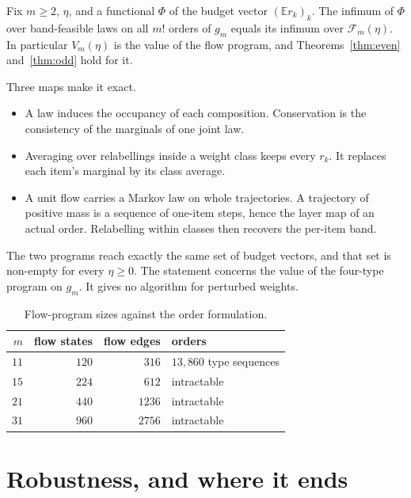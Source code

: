 \begin{theorem}
\label{thm:flow}
Fix $m\ge2$, $\eta$, and a functional $\Phi$ of the budget vector $(\mathbb{E}r_{k})_{k}$. The
infimum of $\Phi$ over band-feasible laws on all $m!$ orders of $g_{m}$ equals its infimum
over $\mathcal{F}_{m}(\eta)$. In particular $V_{m}(\eta)$ is the value of the flow program,
and Theorems~\ref{thm:even} and~\ref{thm:odd} hold for it.
\end{theorem}


Three maps make it exact.
\begin{itemize}
\item A law induces the occupancy of each composition. Conservation is the consistency of the
marginals of one joint law.
\item Averaging over relabellings inside a weight class keeps every $r_{k}$. It replaces each
item's marginal by its class average.
\item A unit flow carries a Markov law on whole trajectories. A trajectory of positive mass is
a sequence of one-item steps, hence the layer map of an actual order. Relabelling within
classes then recovers the per-item band.
\end{itemize}
The two programs reach exactly the same set of budget vectors, and that set is non-empty for
every $\eta\ge0$. The statement concerns the value of the four-type program on $g_{m}$. It
gives no algorithm for perturbed weights.

\begin{table}[t]
\caption{Flow-program sizes against the order formulation. \NUM{}}
\label{tab:agree}
\centering
\footnotesize
\begin{tabular}{@{}rrrl@{}}
\toprule
$m$ & flow states & flow edges & orders \\
\midrule
$11$ & $120$ & $316$ & $13{,}860$ type sequences \\
$15$ & $224$ & $612$ & intractable \\
$21$ & $440$ & $1236$ & intractable \\
$31$ & $960$ & $2756$ & intractable \\
\bottomrule
\end{tabular}
\end{table}

\section{Robustness, and where it ends}
\label{sec:robust}

